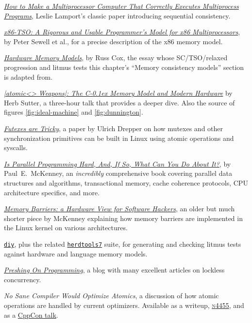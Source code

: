 \documentclass[fontsize=10pt, oneside]{scrartcl}
\newcommand{\cplusplus}[1]{C\kern-0.1ex\raisebox{0.15ex}{\texttt{++}}}
\begin{document}
\href{https://lamport.azurewebsites.net/pubs/multi.pdf}{%
\textit{How to Make a Multiprocessor Computer That Correctly Executes Multiprocess Programs}},
Leslie Lamport's classic paper introducing sequential consistency.

\href{https://www.cl.cam.ac.uk/~pes20/weakmemory/cacm.pdf}{%
\textit{x86-TSO: A Rigorous and Usable Programmer's Model for x86 Multiprocessors}},
by Peter Sewell et al.,
for a precise description of the x86 memory model.

\href{https://research.swtch.com/hwmm}{%
\textit{Hardware Memory Models}},
by Russ Cox,
the essay whose SC/TSO/relaxed progression and litmus tests this chapter's
``Memory consistency models'' section is adapted from.

\href{https://herbsutter.com/2013/02/11/atomic-weapons-the-c-memory-model-and-modern-hardware/}{%
\textit{\cpp|atomic<> Weapons|: The \cplusplus{11} Memory Model and Modern Hardware}}
by Herb Sutter,
a three-hour talk that provides a deeper dive.
Also the source of figures \ref{fig:ideal-machine} and \ref{fig:dunnington}.

\href{https://www.akkadia.org/drepper/futex.pdf}{\textit{Futexes are Tricky}},
a paper by Ulrich Drepper on how mutexes and other synchronization primitives can be built in Linux using atomic operations and syscalls.

\href{https://www.kernel.org/pub/linux/kernel/people/paulmck/perfbook/perfbook.html}{%
\textit{Is Parallel Programming Hard, And, If So, What Can You Do About It?}},
by Paul~E.\ McKenney,
an \emph{incredibly} comprehensive book covering parallel data structures and
algorithms, transactional memory, cache coherence protocols,
\textsc{CPU} architecture specifics, and more.

\href{http://www.rdrop.com/~paulmck/scalability/paper/whymb.2010.06.07c.pdf}{%
\textit{Memory Barriers: a Hardware View for Software Hackers}},
an older but much shorter piece by McKenney explaining how memory barriers are implemented
in the Linux kernel on various architectures.

\href{https://diy.inria.fr/}{\texttt{diy}},
plus the related
\href{https://github.com/herd/herdtools7}{\texttt{herdtools7}} suite,
for generating and checking litmus tests against hardware and language memory models.

\href{https://preshing.com/archives/}{\textit{Preshing On Programming}},
a blog with many excellent articles on lockless concurrency.

\textit{No Sane Compiler Would Optimize Atomics},
a discussion of how atomic operations are handled by current optimizers.
Available as a writeup,
\href{http://www.open-std.org/jtc1/sc22/wg21/docs/papers/2015/n4455.html}{%
\textsc{n}4455}, and as a
\href{https://www.youtube.com/watch?v=IB57wIf9W1k}{CppCon talk}.
\end{document}
